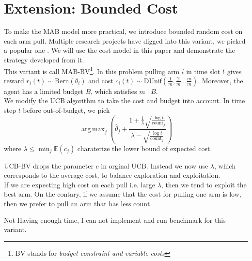 \documentclass{article}
\DeclareMathOperator*{\argmax}{arg\,max}
\newenvironment{newSec}[1]{
	\section{#1}
	\lhead{#1}
	\chead{}
	\rhead{}
}{ \newpage }
\begin{document}
\begin{newSec}{Extension: Bounded Cost}
	To make the MAB model more practical, we introduce bounded random cost on each arm pull.
	Multiple research projects have digged into this variant, we picked a popular one \cite{paper:cost}.
	We will use the cost model in this paper and demonstrate the strategy developed from it.\\

	This variant is call MAB-BV\footnote{BV stands for \textit{budget constraint and variable costs}}.
	In this problem pulling arm $i$ in time slot $t$ gives reward $r_i(t)\sim \mathrm{Bern}(\theta_i)$ and cost $c_i(t)\sim \mathrm{DUnif}(\frac{1}{m},\frac{2}{m}\ldots \frac{m}{m})$.
	Moreover, the agent has a limited budget $B$, which satisfies $m \mid B$.\\

	We modify the UCB algorithm to take the cost and budget into account.
	In time step $t$ before out-of-budget, we pick
	\[
		\argmax_j
		\left(
		\hat\theta_j + \frac{1+\frac{1}{\lambda} \sqrt{\frac{\log t}{\mathrm{count}_j}}}{\lambda-\sqrt{\frac{\log t}{\mathrm{count}_j}}}
		\right)
	\]
	where $\lambda \leq \min_j \mathbb{E}(c_j)$ charaterize the lower bound of expected cost.\par

	UCB-BV drops the parameter $c$ in orginal UCB. Instead we now use $\lambda$, which corresponds to the average cost, to balance exploration and exploitation.\\
	If we are expecting high cost on each pull i.e. large $\lambda$,
	then we tend to exploit the best arm.
	On the contary, if we assume that the cost for pulling one arm is low, then we prefer to pull an arm that has less $\mathrm{count}$.

	\vspace{4ex}

	Not Having enough time, I can not implement and run benchmark for this variant.
\end{newSec}

\newpage
\appendix
\printbibliography[
	heading=bibintoc,
	title={reference}
]

\end{document}
